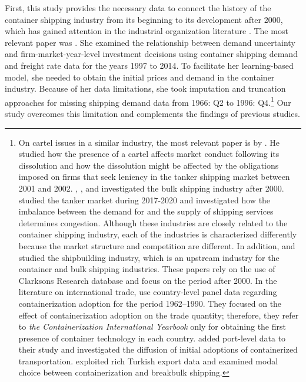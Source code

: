 \documentclass[11pt]{article}
\begin{document}
First, this study provides the necessary data to connect the history of the container shipping industry from its beginning to its development after 2000, which has gained attention in the industrial organization literature  \citep{aguirregabiria2021dynamic}. The most relevant paper was \cite{jeon2022learning}. She examined the relationship between demand uncertainty and firm-market-year-level investment decisions using container shipping demand and freight rate data for the years 1997 to 2014. To facilitate her learning-based model, she needed to obtain the initial prices and demand in the container industry. Because of her data limitations, she took imputation and truncation approaches for missing shipping demand data from 1966: Q2 to 1996: Q4.\footnote{On cartel issues in a similar industry, the most relevant paper is by \cite{asker2010leniency}. He studied how the presence of a cartel affects market conduct following its dissolution and how the dissolution might be affected by the obligations imposed on firms that seek leniency in the tanker shipping market between 2001 and 2002. \cite{kalouptsidi2014aer}, \cite{brancaccio2020geography}, and \cite{greenwood2015waves} investigated the bulk shipping industry after 2000. \cite{bai2021congestion} studied the tanker market during 2017-2020 and investigated how the imbalance between the demand for and the supply of shipping services
determines congestion. Although these industries are closely related to the container shipping industry, each of the industries is characterized differently because the market structure and competition are different. In addition, \cite{kalouptsidi2017res} and \cite{barwick2019china} studied the shipbuilding industry, which is an upstream industry for the container and bulk shipping industries. These papers rely on the use of Clarksons Research database and focus on the period after 2000. In the literature on international trade, \cite{bernhofen2016estimating} use country-level panel data regarding containerization adoption for the period 1962–1990. They focused on the effect of containerization adoption on the trade quantity; therefore, they refer to \textit{the Containerization International Yearbook} only for obtaining the first presence of container technology in each country. \cite{rua2014diffusion} added port-level data to their study and investigated the diffusion of initial adoptions of containerized transportation. \cite{cocsar2018shipping} exploited rich Turkish export data and examined modal choice between containerization and breakbulk shipping.} Our study overcomes this limitation and complements the findings of previous studies.
\end{document}
